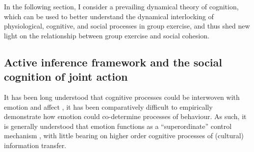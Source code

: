 \begin{CJK}{UTF8}{gbsn}
In the following section, I consider a prevailing dynamical theory of cognition, which can be used to better understand the dynamical interlocking of physiological, cognitive, and social processes in group exercise, and thus shed new light on the relationship between group exercise and social cohesion.







\subsection{Active inference framework and the social cognition of joint action}

It has been long understood that cognitive processes could be interwoven with emotion and affect \citep[cf.][]{Damasio1994}, it has been comparatively difficult to empirically demonstrate how emotion could co-determine processes of behaviour.  As such, it is generally understood that emotion functions as a ``superordinate'' control mechanism \citep{Cosmides2000}, with little bearing on higher order cognitive processes of (cultural) information transfer.


\end{CJK}

